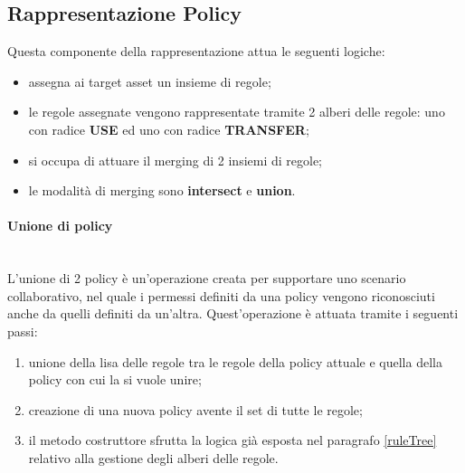 \documentclass[12pt,a4paper,twoside]{book}
\begin{document}
\subsection{Rappresentazione Policy}
Questa componente della rappresentazione attua le seguenti logiche:
\begin{itemize}
\item assegna ai target asset un insieme di regole;
\item le regole assegnate vengono rappresentate tramite 2 alberi delle regole: uno con radice \textbf{USE} ed uno con radice \textbf{TRANSFER};
\item si occupa di attuare il merging di 2 insiemi di regole;
\item le modalità di merging sono \textbf{intersect} e \textbf{union}.
\end{itemize}
\paragraph{Unione di policy}\mbox{}\\
L'unione di 2 policy è un'operazione creata per supportare uno scenario collaborativo, nel quale i permessi definiti da una policy vengono riconosciuti anche da quelli definiti da un'altra. Quest'operazione è attuata tramite i seguenti passi:
\begin{enumerate}
\item unione della lisa delle regole tra le regole della policy attuale e quella della policy con cui la si vuole unire;
\item creazione di una nuova policy avente il set di tutte le regole;
\item il metodo costruttore sfrutta la logica già esposta nel paragrafo \ref{ruleTree} relativo alla gestione degli alberi delle regole.
\end{enumerate}
\end{document}
